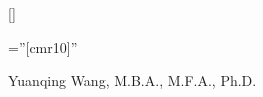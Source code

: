 



 
\usepackage[square, numbers]{natbib}
\usepackage{bibentry}
\titleformat{\section}{\Large\scshape\raggedright}{}{0em}{}[\titlerule]





\usepackage{longtable}



\pagestyle{empty} %

\font\fb=''[cmr10]'' %

\par{\centering
		{ \huge  Yuanqing Wang, }
        { \small M.B.A., M.F.A., Ph.D.}
 \bigskip\par}

